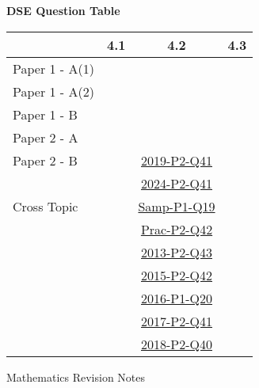 \documentclass[12pt, a4paper]{article}
\begin{document}
\begin{absolutelynopagebreak}
\begin{center}
\textbf{DSE Question Table}
\end{center}
\begin{center}
\begin{tabular}{|l|c|c|c|}
\hline
        & 4.1 & 4.2 & 4.3 \\\hline
\hline
Paper 1 - A(1)&  &  &  \\
\hline
Paper 1 - A(2)&  &  &  \\
\hline
Paper 1 - B&  &  &  \\
\hline
\hline
Paper 2 - A&  &  &  \\
\hline
Paper 2 - B&  & \hyperref[DSE2019-CoreP2-Q41]{2019-P2-Q41} &  \\
&  & \hyperref[DSE2024-CoreP2-Q41]{2024-P2-Q41} &  \\
\hline
\hline
Cross Topic&  & \hyperref[DSE2012S-CoreP1-Q19]{Samp-P1-Q19} &  \\
&  & \hyperref[DSE2012P-CoreP2-Q42]{Prac-P2-Q42} &  \\
&  & \hyperref[DSE2013-CoreP2-Q43]{2013-P2-Q43} &  \\
&  & \hyperref[DSE2015-CoreP2-Q42]{2015-P2-Q42} &  \\
&  & \hyperref[DSE2016-CoreP1-Q20]{2016-P1-Q20} &  \\
&  & \hyperref[DSE2017-CoreP2-Q41]{2017-P2-Q41} &  \\
&  & \hyperref[DSE2018-CoreP2-Q40]{2018-P2-Q40} &  \\
\hline
\end{tabular}
\end{center}
\end{absolutelynopagebreak}
\newpage
\newpage
\thispagestyle{empty}
\begin{center}
Mathematics Revision Notes\\\vspace{1cm}
\\\vspace{1cm}
{\fontsize{24pt}{24pt}\selectfont {Quadrilaterals}} \\\vspace{1cm}
\label{chapter:S3-5}

\end{center}
\vspace{0.5cm}
\hline
\end{document}
